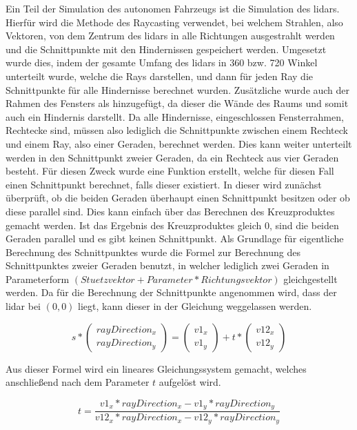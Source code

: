 Ein Teil der Simulation des autonomen Fahrzeugs ist die Simulation des \ac{lidar}s. Hierfür wird die Methode des Raycasting verwendet, bei welchem Strahlen, also Vektoren, von dem Zentrum des \ac{lidar}s in alle Richtungen ausgestrahlt werden und die Schnittpunkte mit den Hindernissen gespeichert werden. Umgesetzt wurde dies, indem der gesamte Umfang des \ac{lidar}s in 360 bzw. 720 Winkel unterteilt wurde, welche die Rays darstellen, und dann für jeden Ray die Schnittpunkte für alle Hindernisse berechnet wurden. Zusätzliche wurde auch der Rahmen des Fensters als hinzugefügt, da dieser die Wände des Raums und somit auch ein Hindernis darstellt. Da alle Hindernisse, eingeschlossen Fensterrahmen, Rechtecke sind, müssen also lediglich die Schnittpunkte zwischen einem Rechteck und einem Ray, also einer Geraden, berechnet werden. Dies kann weiter unterteilt werden in den Schnittpunkt zweier Geraden, da ein Rechteck aus vier Geraden besteht. Für diesen Zweck wurde eine Funktion erstellt, welche für diesen Fall einen Schnittpunkt berechnet, falls dieser existiert. In dieser wird zunächst überprüft, ob die beiden Geraden überhaupt einen Schnittpunkt besitzen oder ob diese parallel sind. Dies kann einfach über das Berechnen des Kreuzproduktes gemacht werden. Ist das Ergebnis des Kreuzproduktes gleich \(0\), sind die beiden Geraden parallel und es gibt keinen Schnittpunkt. Als Grundlage für eigentliche Berechnung des Schnittpunktes wurde die Formel zur Berechnung des Schnittpunktes zweier Geraden benutzt, in welcher lediglich zwei Geraden in Parameterform \((Stuetzvektor + Parameter * Richtungsvektor)\) gleichgestellt werden. Da für die Berechnung der Schnittpunkte angenommen wird, dass der \ac{lidar} bei \((0, 0)\) liegt, kann dieser in der Gleichung weggelassen werden. 

\[
s * 
\begin{pmatrix}
    rayDirection_x \\ 
    rayDirection_y
\end{pmatrix}
= 
\begin{pmatrix}
    v1_x \\ 
    v1_y
\end{pmatrix}
+ t * 
\begin{pmatrix}
    v12_x \\ 
    v12_y
\end{pmatrix}
\]

Aus dieser Formel wird ein lineares Gleichungssystem gemacht, welches anschließend nach dem Parameter \(t\) aufgelöst wird.

\[
t = \frac{v1_x * rayDirection_x - v1_y * rayDirection_y}{v12_x * rayDirection_x - v12_y * rayDirection_y} 
\]

